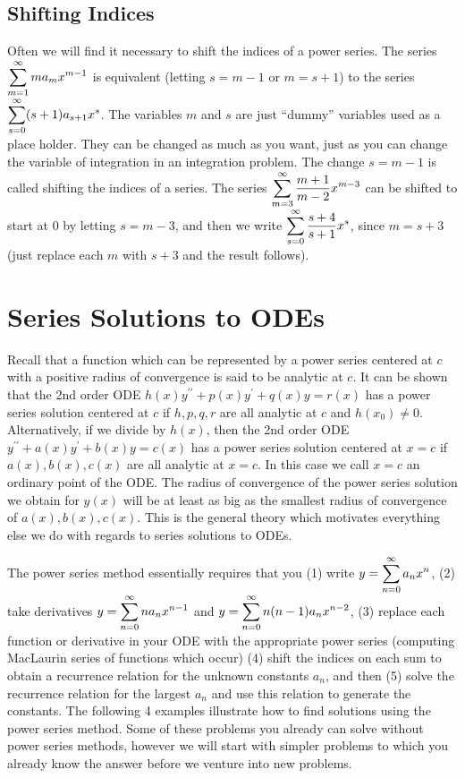\subsection{Shifting Indices}
Often we will find it necessary to shift the indices of a power series. The series $\displaystyle\sum_{m=1}^\infty m a_m x^{m-1}$ is equivalent (letting $s=m-1$ or $m=s+1$) to the series $\displaystyle\sum_{s=0}^\infty (s+1)a_{s+1} x^{s}$. The variables $m$ and $s$ are just ``dummy'' variables used as a place holder.  They can be changed as much as you want, just as you can change the variable of integration in an integration problem.  The change $s=m-1$ is called shifting the indices of a series.  The series $\displaystyle\sum_{m=3}^\infty \frac{m+1}{m-2} x^{m-3}$ can be shifted to start at $0$ by letting $s=m-3$, and then we write $\displaystyle\sum_{s=0}^\infty \frac{s+4}{s+1} x^{s}$, since $m=s+3$ (just replace each $m$ with $s+3$ and the result follows). 












\section{Series Solutions to ODEs}


Recall that a function which can be represented by a power series centered at $c$ with a positive radius of convergence is said to be analytic at $c$. It can be shown that the 2nd order ODE $h(x)y^{\prime\prime}+p(x)y^\prime+q(x)y=r(x)$ has a power series solution centered at $c$ if $h,p,q,r$ are all analytic at $c$ and $h(x_0)\neq 0$. Alternatively, if we divide by $h(x)$, then the 2nd order ODE $y^{\prime\prime}+a(x)y^\prime+b(x)y=c(x)$ has a power series solution centered at $x=c$ if $a(x),b(x),c(x)$ are all analytic at $x=c$.  In this case we call $x=c$ an ordinary point of the ODE.  The radius of convergence of the power series solution we obtain for $y(x)$ will be at least as big as the smallest radius of convergence of $a(x),b(x),c(x)$. This is the general theory which motivates everything else we do with regards to series solutions to ODEs. 

The power series method essentially requires that you (1) write $\displaystyle y=\sum_{n=0}^\infty a_n x^n$, (2) take derivatives $\displaystyle y=\sum_{n=0}^\infty n a_n x^{n-1}$ and $\displaystyle y=\sum_{n=0}^\infty n(n-1) a_n x^{n-2}$, (3) replace each function or derivative in your ODE with the appropriate power series (computing MacLaurin series of functions which occur) (4) shift the indices on each sum to obtain a recurrence relation for the unknown constants $a_n$, and then (5) solve the recurrence relation for the largest $a_n$ and use this relation to generate the constants.  The following 4 examples illustrate how to find solutions using the power series method. Some of these problems you already can solve without power series methods, however we will start with simpler problems to which you already know the answer before we venture into new problems.

